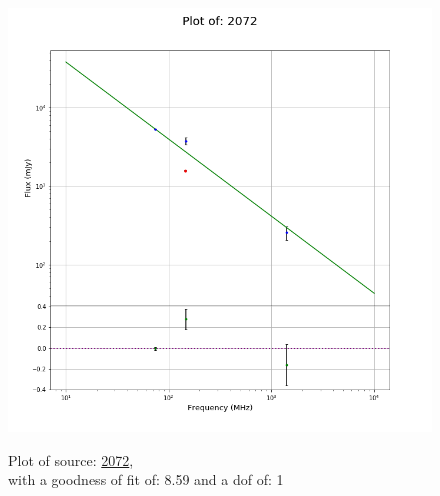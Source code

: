 \documentclass{article}
\begin{document}
\begin{figure}[H]
    \centering
    \begin{minipage}{.5\textwidth}
        \centering
        \includegraphics[scale = 0.35]{KmeulenTrap4P23_1hr/1hr2072.png}
        \captionsetup{labelformat=empty}
        \caption{Plot of source: \href{http://banana.transientskp.org/r4/vlo_KmeulenTrap4P23/runningcatalog/2072}{2072},\\with a goodness of fit of: 8.59 and a dof of: 1}
        \addtocounter{figure}{-1}
        \label{KmeulenTrap4P23:1hr:2072:plot}
    \end{minipage}%
    \begin{minipage}{0.5\textwidth}
        \centering


\end{minipage}
\end{figure}
\end{document}
